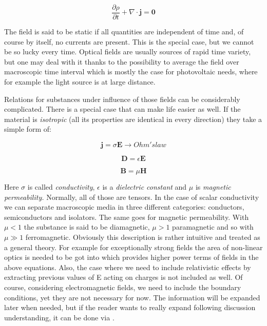 \begin{equation}
\frac{\partial\rho}{\partial t} + \nabla \cdot \mathbf{j = 0}
\end{equation}

The field is said to be static if all quantities are independent of time
and, of course by itself, no currents are present. This is the special case, but we
cannot be so lucky every time. Optical fields are usually sources of rapid time variety, but one may deal with it thanks to the
possibility to average the field over macroscopic time interval which is
mostly the case for photovoltaic needs, where for example the light
source is at large distance.

Relations for substances under influence of those fields can be considerably
complicated. There is a special case that can make life easier as well.
If the material is \emph{isotropic} (all its properties are identical in
every direction) they take a simple form of:

\begin{equation}
\mathbf{j} = \sigma\mathbf{E \rightarrow} Ohm's law
\end{equation}

\begin{equation}
\mathbf{D =}\epsilon\mathbf{E}
\end{equation}

\begin{equation}
\mathbf{B =}\mu\mathbf{H}
\end{equation}

Here \(\sigma\) is called \emph{conductivity}, \(\epsilon\) is a
\emph{dielectric constant} and \(\mu\) is \emph{magnetic permeability.}
Normally, all of those are tensors. In the case of scalar conductivity
we can separate macroscopic media in three different categories:
conductors, semiconductors and isolators. The same goes for magnetic
permeability. With \(\mu < 1\) the substance is said to be diamagnetic,
\(\mu > 1\) paramagnetic and so with \(\mu \gg 1\) ferromagnetic.
Obviously this description is rather intuitive and treated as a general
theory. For example for exceptionally strong fields the area of
non-linear optics is needed to be got into which provides higher power
terms of fields in the above equations. Also, the case where we need to
include relativistic effects by extracting previous values of E acting
on charges is not included as well. Of course, considering electromagnetic fields, we need to include the boundary conditions, yet they are not necessary for now. The information will be expanded later when needed, but if the reader wants to really expand following discussion understanding, it can be done via \cite{Born1999} \cite{Jackson}.


